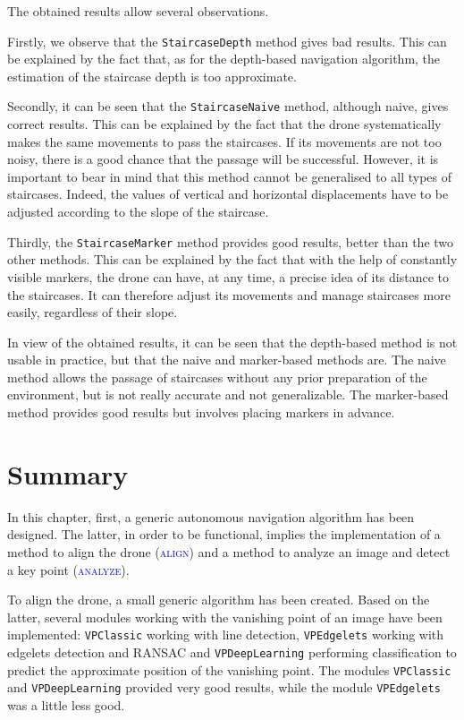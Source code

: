 The obtained results allow several observations.

Firstly, we observe that the \texttt{StaircaseDepth} method gives bad results. This can be explained by the fact that, as for the depth-based navigation algorithm, the estimation of the staircase depth is too approximate.

Secondly, it can be seen that the \texttt{StaircaseNaive} method, although naive, gives correct results. This can be explained by the fact that the drone systematically makes the same movements to pass the staircases. If its movements are not too noisy, there is a good chance that the passage will be successful. However, it is important to bear in mind that this method cannot be generalised to all types of staircases. Indeed, the values of vertical and horizontal displacements have to be adjusted according to the slope of the staircase.

Thirdly, the \texttt{StaircaseMarker} method provides good results, better than the two other methods. This can be explained by the fact that with the help of constantly visible markers, the drone can have, at any time, a precise idea of its distance to the staircases. It can therefore adjust its movements and manage staircases more easily, regardless of their slope.

In view of the obtained results, it can be seen that the depth-based method is not usable in practice, but that the naive and marker-based methods are. The naive method allows the passage of staircases without any prior preparation of the environment, but is not really accurate and not generalizable. The marker-based method provides good results but involves placing markers in advance.

\section{Summary}

In this chapter, first, a generic autonomous navigation algorithm has been designed. The latter, in order to be functional, implies the implementation of a method to align the drone (\textsc{\textcolor{blue}{align}}) and a method to analyze an image and detect a key point (\textsc{\textcolor{blue}{analyze}}).

To align the drone, a small generic algorithm has been created. Based on the latter, several modules working with the vanishing point of an image have been implemented: \texttt{VPClassic} working with line detection, \texttt{VPEdgelets} working with edgelets detection and RANSAC and \texttt{VPDeepLearning} performing classification to predict the approximate position of the vanishing point. The modules \texttt{VPClassic} and \texttt{VPDeepLearning} provided very good results, while the module \texttt{VPEdgelets} was a little less good.

